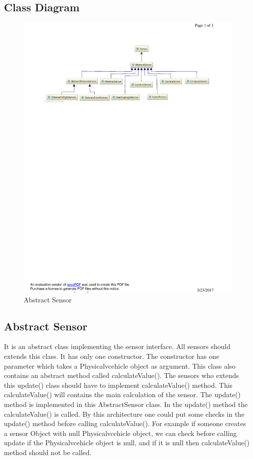 \documentclass[]{article}
\begin{document}
\subsection{Class Diagram}
\begin{figure}[H]
	\centering
	\includegraphics[scale=0.9]{diagram.pdf}
	\caption{Abstract Sensor}
	\label{fig::as}
\end{figure}
\subsection{Abstract Sensor}
It is an abstract class implementing the sensor interface. All sensors should extends this class. It has only one constructor. The constructor has one parameter which takes a Physicalvcehicle object as argument. This class also contains an abstract method called calculateValue(). The sensors who extends this update() class should have to implement calculateValue() method. This calculateValue() will contains the main calculation of the sensor. The update() method is implemented in this AbstractSensor class. In the update() method the calculateValue() is called. By this architecture one could put some checks in the update() method before calling calculateValue(). For example if someone creates a sensor Object with null Physicalvcehicle object, we can check before calling update if the  Physicalvcehicle object is null, and if it is null then calculateValue() method should not be called.
\end{document}
